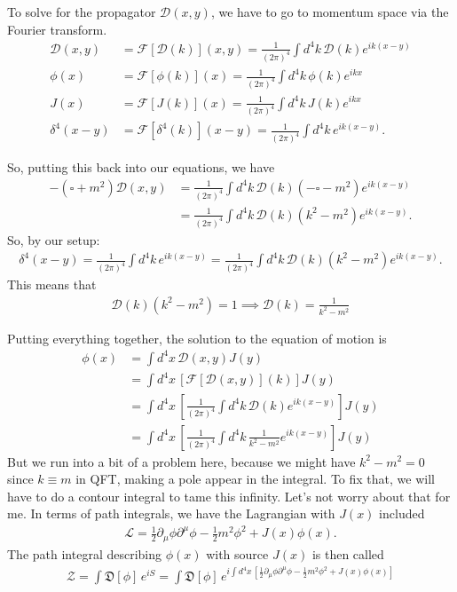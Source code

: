 \documentclass{book}
\theoremstyle{definition}
\newcommand{\p}{\partial}
\newcommand{\lag}{\mathcal{L}}
\newcommand{\F}{\mathcal{F}}
\newcommand{\f}[2]{\frac{#1}{#2}}
\newcommand{\lb}{\left[}
\newcommand{\rb}{\right]}
\newcommand{\D}{\mathcal{D}}
\newcommand{\Z}{\mathcal{Z}}
\begin{document}
To solve for the propagator $\D(x,y)$, we have to go to momentum space via the Fourier transform. 
\begin{align}
\D(x,y) &= \F[\D(k)](x,y) =  \f{1}{(2\pi)^4} \int d^4 k \, \D(k)e^{i k (x-y)}\\ 
\phi(x) &= \F[\phi(k)](x) =  \f{1}{(2\pi)^4} \int d^4 k \, \phi(k) e^{ikx}\\
J(x) &= \F[J(k)](x) =  \f{1}{(2\pi)^4} \int d^4 k \, J(k) e^{ikx}\\
\delta^4(x-y) &= \F[\delta^4(k)](x-y) =  \f{1}{(2\pi)^4} \int d^4 k \, e^{ik(x-y)}.
\end{align}

So, putting this back into our equations, we have
\begin{align}
-(\square + m^2)\D(x,y) &= \f{1}{(2\pi)^4} \int d^4 k\, \D(k)(- \square - m^2)e^{ik(x-y)}\\
&= \f{1}{(2\pi)^4}\int d^4 k\, \D(k)(k^2 - m^2)e^{ik(x-y)}.
\end{align}
So, by our setup:
\begin{align}
\delta^4(x-y) =\f{1}{(2\pi)^4}\int d^4 k\, e^{ik(x-y)}  = \f{1}{(2\pi)^4}\int d^4 k\, \D(k)(k^2 - m^2)e^{ik(x-y)} .
\end{align}
This means that
\begin{align}
\boxed{\D(k)(k^2 - m^2) = 1 \implies \D(k) = \f{1}{k^2 - m^2}}
\end{align}

Putting everything together, the solution to the equation of motion is
\begin{align}
\phi(x) &= \int d^4 x\, \D(x,y) J(y) \\ 
&=  \int d^4 x\, \lb \F[\D(x,y)](k)   \rb J(y)\\
&= \int d^4 x\, \lb  \f{1}{(2\pi)^4} \int d^4 k \, \D(k)e^{i k (x-y)}  \rb J(y)\\
&= \boxed{\int d^4 x\, \lb  \f{1}{(2\pi)^4} \int d^4 k \, \f{1}{k^2 - m^2} e^{i k (x-y)}  \rb J(y)}
\end{align}
But we run into a bit of a problem here, because we might have $k^2 - m^2 = 0$ since $k \equiv m$ in QFT, making a pole appear in the integral. To fix that, we will have to do a contour integral to tame this infinity. Let's not worry about that for me. In terms of path integrals, we have the Lagrangian with $J(x)$ included
\begin{align}
\lag = \f{1}{2}\p_\mu \phi \p^\mu \phi - \f{1}{2}m^2\phi^2 + J(x)\phi(x).
\end{align}
The path integral describing $\phi(x)$ with source $J(x)$ is then called 
\begin{align}
\boxed{\Z = \int \mathfrak{D}[\phi]\, e^{iS} = \int \mathfrak{D}[\phi]\, e^{i\int d^4x\, \lb \f{1}{2}\p_\mu \phi \p^\mu \phi - \f{1}{2}m^2\phi^2 + J(x)\phi(x) \rb}}
\end{align}
\end{document}
